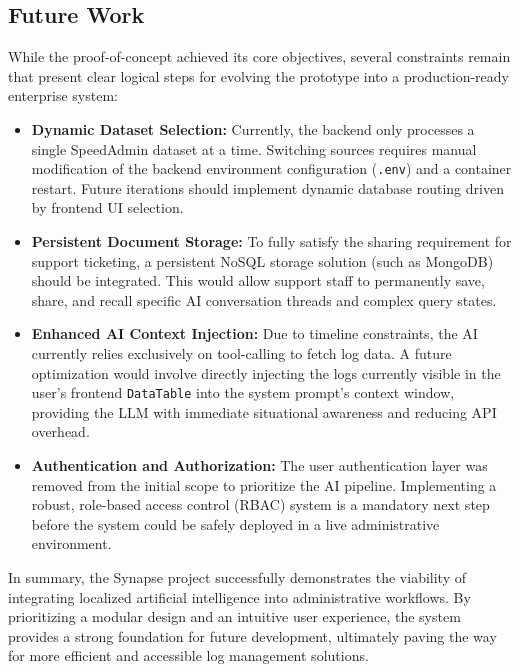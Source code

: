 \subsection{Future Work}
While the proof-of-concept achieved its core objectives, several constraints remain that present clear logical steps for evolving the prototype into a production-ready enterprise system:

\begin{itemize}
    \item \textbf{Dynamic Dataset Selection:} Currently, the backend only processes a single SpeedAdmin dataset at a time. Switching sources requires manual modification of the backend environment configuration (\texttt{.env}) and a container restart. Future iterations should implement dynamic database routing driven by frontend UI selection.
    \item \textbf{Persistent Document Storage:} To fully satisfy the sharing requirement for support ticketing, a persistent NoSQL storage solution (such as MongoDB) should be integrated. This would allow support staff to permanently save, share, and recall specific AI conversation threads and complex query states.
    \item \textbf{Enhanced AI Context Injection:} Due to timeline constraints, the AI currently relies exclusively on tool-calling to fetch log data. A future optimization would involve directly injecting the logs currently visible in the user's frontend \texttt{DataTable} into the system prompt's context window, providing the LLM with immediate situational awareness and reducing API overhead.
    \item \textbf{Authentication and Authorization:} The user authentication layer was removed from the initial scope to prioritize the AI pipeline. Implementing a robust, role-based access control (RBAC) system is a mandatory next step before the system could be safely deployed in a live administrative environment.
\end{itemize}

In summary, the Synapse project successfully demonstrates the viability of integrating localized artificial intelligence into administrative workflows. By prioritizing a modular design and an intuitive user experience, the system provides a strong foundation for future development, ultimately paving the way for more efficient and accessible log management solutions.
\pagebreak